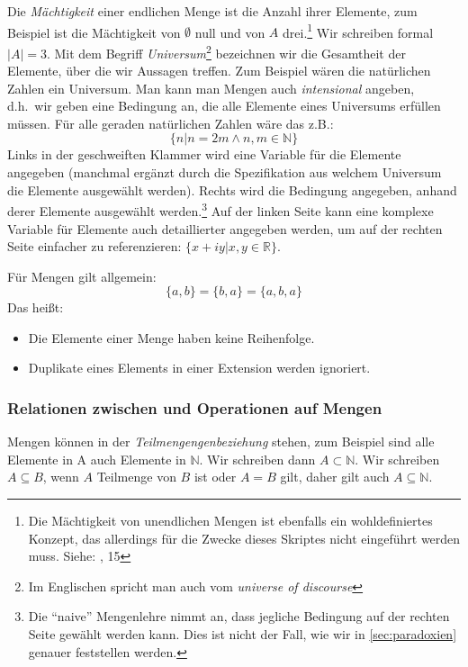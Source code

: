 Die \emph{Mächtigkeit} einer endlichen Menge ist die Anzahl ihrer Elemente,
zum Beispiel ist die Mächtigkeit von $\emptyset$ null und von $A$ drei.\footnote{
    Die Mächtigkeit von unendlichen Mengen ist ebenfalls ein wohldefiniertes Konzept,
    das allerdings für die Zwecke dieses Skriptes nicht eingeführt werden muss.
    Siehe: \cite{link}, 15
}
Wir schreiben formal $|A| = 3$.
Mit dem Begriff \emph{Universum}\footnote{
    Im Englischen spricht man auch vom \emph{universe of discourse}
} bezeichnen wir die Gesamtheit der Elemente,
über die wir Aussagen treffen.
Zum Beispiel wären die natürlichen Zahlen ein Universum.
Man kann man Mengen auch \emph{intensional} angeben,
d.h.\ wir geben eine Bedingung an,
die alle Elemente eines Universums erfüllen müssen.
Für alle geraden natürlichen Zahlen wäre das z.B.:
\[\{n| n = 2m \wedge n,m \in \mathbb{N} \}\]
Links in der geschweiften Klammer wird eine Variable für die Elemente angegeben
(manchmal ergänzt durch die Spezifikation aus welchem Universum die Elemente ausgewählt werden).
Rechts wird die Bedingung angegeben, anhand derer Elemente ausgewählt werden.\footnote{
    Die ``naive'' Mengenlehre nimmt an,
    dass jegliche Bedingung auf der rechten Seite gewählt werden kann.
    Dies ist nicht der Fall, wie wir in \autoref{sec:paradoxien} genauer feststellen werden.
}
Auf der linken Seite kann eine komplexe Variable für Elemente auch detaillierter angegeben werden,
um auf der rechten Seite einfacher zu referenzieren:
$\{x + iy| x,y \in \mathbb{R}\}$.

Für Mengen gilt allgemein:
\[ \{a,b\} = \{b,a\} = \{a,b,a\} \]
Das heißt:
\begin{itemize}
    \item Die Elemente einer Menge haben keine Reihenfolge.
    \item Duplikate eines Elements in einer Extension werden ignoriert.
\end{itemize}



\subsubsection{Relationen zwischen und Operationen auf Mengen}

Mengen können in der \emph{Teilmengengenbeziehung} stehen,
zum Beispiel sind alle Elemente in A auch Elemente in $\mathbb{N}$.
Wir schreiben dann $A \subset \mathbb{N}$.
Wir schreiben $A \subseteq B$, wenn $A$ Teilmenge von $B$ ist oder $A = B$ gilt,
daher gilt auch $A \subseteq \mathbb{N}$.

